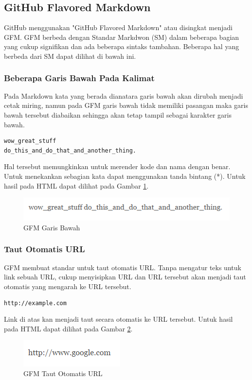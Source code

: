 \subsection{GitHub Flavored Markdown \cite{Markdown:2015}}
GitHub menggunakan "GitHub Flavored Markdown" atau disingkat menjadi GFM. GFM
berbeda dengan Standar Markdwon (SM) dalam beberapa bagian yang cukup signifikan
dan ada beberapa sintaks tambahan. Beberapa hal yang berbeda dari SM dapat
dilihat di bawah ini.

\subsubsection{Beberapa Garis Bawah Pada Kalimat}
Pada Markdown kata yang berada dianatara garis bawah akan dirubah menjadi cetak
miring, namun pada GFM garis bawah tidak memiliki pasangan maka garis
bawah tersebut diabaikan sehingga akan tetap tampil sebagai karakter garis
bawah.
\begin{lstlisting}
wow_great_stuff
do_this_and_do_that_and_another_thing.
\end{lstlisting}
Hal tersebut memungkinkan untuk merender kode dan nama dengan benar. Untuk
menekankan sebagian kata dapat menggunakan tanda bintang (*). Untuk hasil pada
HTML dapat dilihat pada Gambar \ref{fig:gb}.
\begin{figure}[H]
\centering
\includegraphics[scale=1]{Gambar/garisbawah.png}
\caption[GFM Garis Bawah]{GFM Garis Bawah}
\label{fig:gb}
\end{figure}

\subsubsection{Taut Otomatis URL}
GFM membuat standar untuk taut otomatis URL. Tanpa mengatur teks untuk link
sebuah URL, cukup menyisipkan URL dan URL tersebut akan menjadi taut otomatis
yang mengarah ke URL tersebut.
\begin{lstlisting}
http://example.com
\end{lstlisting}
Link di atas kan menjadi taut secara otomatis ke URL tersebut. Untuk hasil pada
HTML dapat dilihat pada Gambar \ref{fig:gfml}.
\begin{figure}[H]
\centering
\includegraphics[scale=1]{Gambar/gfml.png}
\caption[GFM Taut Otomatis URL]{GFM Taut Otomatis URL}
\label{fig:gfml}
\end{figure}

